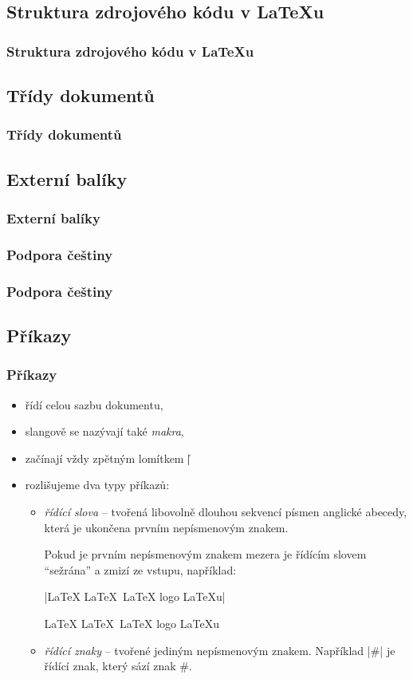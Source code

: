 \subsection{Struktura zdrojového kódu v \LaTeX{}u}
\begin{frame}
	\frametitle{Struktura zdrojového kódu v \LaTeX{}u}
	\UnderConstruction
\end{frame}


\subsection{Třídy dokumentů}
\begin{frame}
	\frametitle{Třídy dokumentů}
	\UnderConstruction
\end{frame}


\subsection{Externí balíky}
\begin{frame}
	\frametitle{Externí balíky}
	\UnderConstruction
\end{frame}


\subsubsection{Podpora češtiny}
\begin{frame}
	\frametitle{Podpora češtiny}
	\UnderConstruction
\end{frame}


\subsection{Příkazy}
\begin{frame}[fragile]
	\frametitle{Příkazy}
	\begin{itemize}
		\item řídí celou sazbu dokumentu,
		\item slangově se nazývají také \emph{makra},
		\item začínají vždy zpětným lomítkem |\|
		\item rozlišujeme dva typy příkazů:
			\begin{itemize}
				\item \emph{řídící slova} -- tvořená libovolně dlouhou sekvencí písmen anglické abecedy, která je ukončena prvním nepísmenovým znakem.\par
					Pokud je prvním nepísmenovým znakem mezera je řídícím slovem \enquote{sežrána} a zmizí ze vstupu, například:\par
					|\LaTeX{} \LaTeX\ {\LaTeX} logo \LaTeX u|\par \LaTeX{} \LaTeX\ {\LaTeX} logo \LaTeX u
				\item \emph{řídící znaky} -- tvořené jediným nepísmenovým znakem. Například |\#| je řídící znak, který sází znak \#.
			\end{itemize}
	\end{itemize}
\end{frame}


